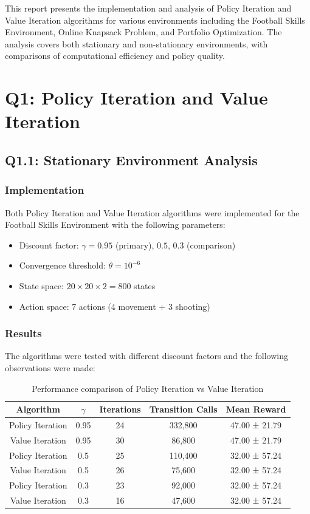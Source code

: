 \documentclass[12pt]{article}
\begin{document}
This report presents the implementation and analysis of Policy Iteration and Value Iteration algorithms for various environments including the Football Skills Environment, Online Knapsack Problem, and Portfolio Optimization. The analysis covers both stationary and non-stationary environments, with comparisons of computational efficiency and policy quality.

\section{Q1: Policy Iteration and Value Iteration}

\subsection{Q1.1: Stationary Environment Analysis}

\subsubsection{Implementation}

Both Policy Iteration and Value Iteration algorithms were implemented for the Football Skills Environment with the following parameters:
\begin{itemize}
    \item Discount factor: $\gamma = 0.95$ (primary), $0.5$, $0.3$ (comparison)
    \item Convergence threshold: $\theta = 10^{-6}$
    \item State space: $20 \times 20 \times 2 = 800$ states
    \item Action space: 7 actions (4 movement + 3 shooting)
\end{itemize}

\subsubsection{Results}

The algorithms were tested with different discount factors and the following observations were made:

\begin{table}[H]
\centering
\begin{tabular}{|c|c|c|c|c|}
\hline
Algorithm & $\gamma$ & Iterations & Transition Calls & Mean Reward \\
\hline
Policy Iteration & 0.95 & 24 & 332,800 & 47.00 ± 21.79 \\
Value Iteration & 0.95 & 30 & 86,800 & 47.00 ± 21.79 \\
Policy Iteration & 0.5 & 25 & 110,400 & 32.00 ± 57.24 \\
Value Iteration & 0.5 & 26 & 75,600 & 32.00 ± 57.24 \\
Policy Iteration & 0.3 & 23 & 92,000 & 32.00 ± 57.24 \\
Value Iteration & 0.3 & 16 & 47,600 & 32.00 ± 57.24 \\
\hline
\end{tabular}
\caption{Performance comparison of Policy Iteration vs Value Iteration}
\end{table}
\end{document}
